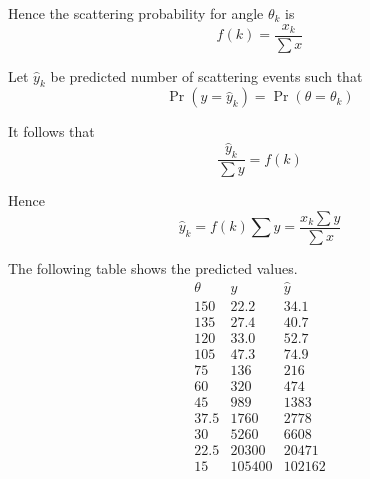 Hence the scattering probability for angle $\theta_k$ is
\begin{equation*}
f(k)=\frac{x_k}{\sum x}
\end{equation*}

Let $\hat y_k$ be predicted number of scattering events such that
\begin{equation*}
\Pr(y=\hat y_k)=\Pr(\theta=\theta_k)
\end{equation*}

It follows that
\begin{equation*}
\frac{\hat y_k}{\sum y}=f(k)
\end{equation*}

Hence
\begin{equation*}
\hat y_k=f(k)\sum y=\frac{x_k\sum y}{\sum x}
\end{equation*}

The following table shows the predicted values.
\begin{equation*}
\begin{matrix}
\theta & y & \hat y\\
150 & 22.2 & 34.1\\
135 & 27.4 & 40.7\\
120 & 33.0 & 52.7\\
105 & 47.3 & 74.9\\
75 & 136 & 216\\
60 & 320 & 474\\
45 & 989 & 1383\\
37.5 & 1760 & 2778\\
30 & 5260 & 6608\\
22.5 & 20300 & 20471\\
15 & 105400 & 102162
\end{matrix}
\end{equation*}

\iffalse

The coefficient of determination $R^2$ measures how well predicted values fit the data.
\begin{equation*}
R^2=1-\frac{\sum (y-\hat y)^2}{\sum (y-\bar y)^2}=0.998
\end{equation*}

The result indicates that $d\sigma$ explains 99.8\%
of the variance in the data.

\fi


